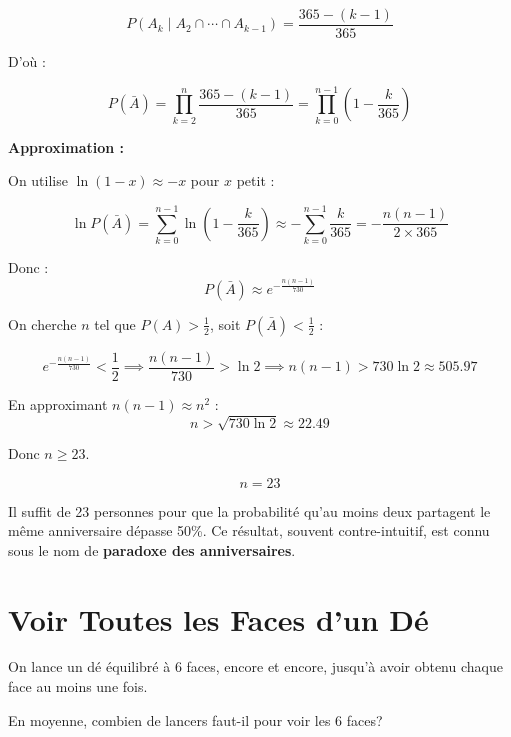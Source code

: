 \[
P\!\left(A_k \mid A_2 \cap \cdots \cap A_{k-1}\right) = \frac{365 - (k-1)}{365}
\]

D'où :

\[
P(\bar{A}) = \prod_{k=2}^{n} \frac{365 - (k-1)}{365} = \prod_{k=0}^{n-1} \left(1 - \frac{k}{365}\right)
\]

\bigskip

\textbf{Approximation :}

On utilise $\ln(1 - x) \approx -x$ pour $x$ petit :

\[
\ln P(\bar{A}) = \sum_{k=0}^{n-1} \ln\!\left(1 - \frac{k}{365}\right) \approx -\sum_{k=0}^{n-1} \frac{k}{365} = -\frac{n(n-1)}{2 \times 365}
\]

Donc :
\[
P(\bar{A}) \approx e^{-\frac{n(n-1)}{730}}
\]

On cherche $n$ tel que $P(A) > \frac{1}{2}$, soit $P(\bar{A}) < \frac{1}{2}$ :

\[
e^{-\frac{n(n-1)}{730}} < \frac{1}{2} \implies \frac{n(n-1)}{730} > \ln 2 \implies n(n-1) > 730 \ln 2 \approx 505.97
\]

En approximant $n(n-1) \approx n^2$ :
\[
n > \sqrt{730 \ln 2} \approx 22.49
\]

Donc $n \geq 23$.





\bigskip

\[
\boxed{n = 23}
\]

Il suffit de 23 personnes pour que la probabilité qu'au moins deux partagent le même anniversaire dépasse 50\%. Ce résultat, souvent contre-intuitif, est connu sous le nom de \textbf{paradoxe des anniversaires}.



\section{Voir Toutes les Faces d'un Dé}

\begin{exerciseBox}
On lance un dé équilibré à 6 faces, encore et encore, jusqu'à avoir obtenu chaque face au moins une fois.

En moyenne, combien de lancers faut-il pour voir les 6 faces?
\end{exerciseBox}



